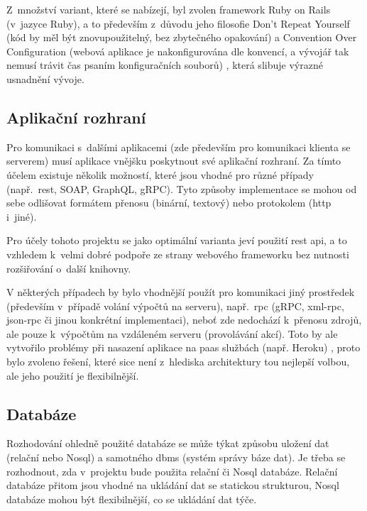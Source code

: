 \documentclass[twoside]{ctuthesis}
\begin{document}
Z~množství variant, které se nabízejí, byl zvolen framework Ruby on Rails (v~jazyce Ruby), a to především z~důvodu jeho filosofie Don't Repeat Yourself (kód by měl být znovupoužitelný, bez zbytečného opakování) a Convention Over Configuration (webová aplikace je nakonfigurována dle konvencí, a vývojář tak nemusí trávit čas psaním konfiguračních souborů) \cite{rails2020}, která slibuje výrazné usnadnění vývoje.

\subsection{Aplikační rozhraní}

Pro komunikaci s~dalšími aplikacemi (zde především pro komunikaci klienta se serverem) musí aplikace vnějšku poskytnout své aplikační rozhraní. Za tímto účelem existuje několik možností, které jsou vhodné pro různé případy (např.~\acrshort{rest}, SOAP, GraphQL, gRPC). Tyto způsoby implementace se mohou od sebe odlišovat formátem přenosu (binární, textový) nebo protokolem (\acrshort{http} i~jiné).

Pro účely tohoto projektu se jako optimální varianta jeví použití \acrshort{rest} \acrshort{api}, a to vzhledem k~velmi dobré podpoře ze strany webového frameworku bez nutnosti rozšiřování o~další knihovny. %

V některých případech by bylo vhodnější použít pro komunikaci jiný prostředek (především v~případě volání výpočtů na serveru), např.~\acrshort{rpc} (gRPC, \acrshort{xml}-\acrshort{rpc}, \acrshort{json}-\acrshort{rpc} či jinou konkrétní implementaci), neboť zde nedochází k~přenosu zdrojů, ale pouze k~výpočtům na vzdáleném serveru (provolávání akcí). \cite{sturgeon2016understanding} Toto by ale vytvořilo problémy při nasazení aplikace na \acrshort{paas} službách (např. Heroku) \cite{lisitsky2018does}, proto bylo zvoleno řešení, které sice není z~hlediska architektury tou nejlepší volbou, ale jeho  použití je flexibilnější.

\subsection{Databáze}

Rozhodování ohledně použité databáze se může týkat způsobu uložení dat (relační nebo No\acrshort{sql}) a samotného \acrshort{dbms} (systém správy báze dat). Je třeba se rozhodnout, zda v~projektu bude použita relační či No\acrshort{sql} databáze. Relační databáze přitom jsou vhodné na ukládání dat se statickou strukturou, No\acrshort{sql} databáze mohou být flexibilnější, co se ukládání dat týče.  \cite{geeks2020difference}
\end{document}
